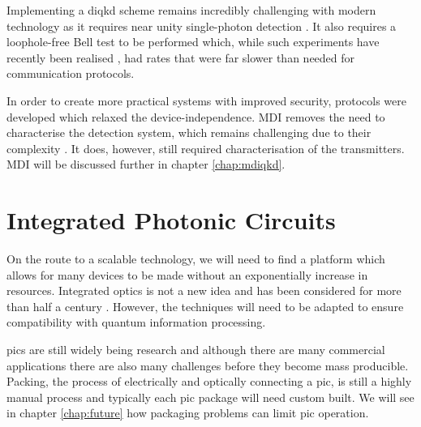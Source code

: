 Implementing a \ac{diqkd} scheme remains incredibly challenging with modern technology as it requires near unity single-photon detection \cite{pironio2009device}. It also requires a loophole-free Bell test to be performed which, while such experiments have recently been realised \cite{Giustina2015, shalm2015, hensen2015}, had rates that were far slower than needed for communication protocols. 

In order to create more practical systems with improved security, protocols were developed which relaxed the device-independence. \Ac{MDI} removes the need to characterise the detection system, which remains challenging due to their complexity \cite{mdi-qkd}. It does, however, still required characterisation of the transmitters. \Ac{MDI} will be discussed further in chapter \ref{chap:mdiqkd}.




\section{Integrated Photonic Circuits}

On the route to a scalable technology, we will need to find a platform which allows for many devices to be made without an exponentially increase in resources. Integrated optics is not a new idea and has been considered for more than half a century \cite{miller1969}. However, the techniques will need to be adapted to ensure compatibility with quantum information processing.

\Acp{pic} are still widely being research and although there are many commercial applications there are also many challenges before they become mass producible. Packing, the process of electrically and optically connecting a \ac{pic}, is still a highly manual process and typically each \ac{pic} package will need custom built. We will see in chapter \ref{chap:future} how packaging problems can limit \ac{pic} operation.

